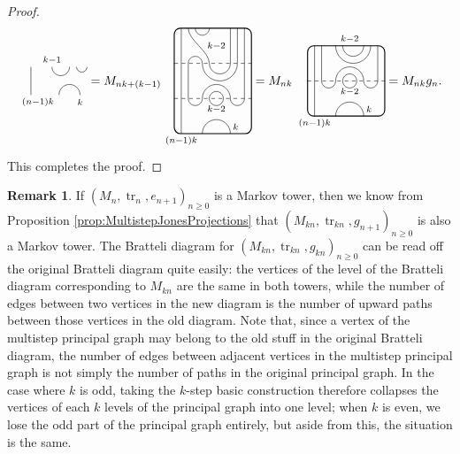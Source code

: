 \documentclass[11pt]{article}
\theoremstyle{plain}
\theoremstyle{definition}
\newtheorem{remark}[thm]{Remark}
\DeclareMathOperator{\tr}{tr}
\begin{document}
\begin{proof}
$$\begin{tikzpicture}[baseline = .3cm]
 \draw (.2,0) -- (.2,.8);
 \draw (.8,.8) arc (-180:0:.25cm);
 \draw (1.5,.8) arc (-180:0:.15cm);
 \draw (1,0) arc (180:0:.3cm);
 \node at (.8,1) {\scriptsize{$k{-}1$}};
 \node at (1.6,-.2) {\scriptsize{$k$}};
 \node at (.4,-.2) {\scriptsize{$(n{-}1)k$}};
\end{tikzpicture}
=
M_{nk+(k-1)}
\begin{tikzpicture}[baseline = 1.4cm]
 \draw[thick, rounded corners = 5pt] (0,0) rectangle (2.2,3);
 \draw (.2,0) -- (.2,3);
 \draw (.6,3) arc (-180:0:.2cm);
 \draw (.4,3) .. controls ++(270:.35cm) and ++(90:.35cm) .. (1,2) arc (-180:0:.3cm) -- (1.6,3);
 \draw (1.8,3) -- (1.8,2) arc (0:-180:.5cm) arc (0:180:.2cm) -- (.4,1) arc (-180:0:.2cm) arc (180:0:.4cm) arc (-180:0:.2cm) -- (2,3);
 \draw (1.2,1) circle (.2cm);
 \draw (.8,0) arc (180:0:.4cm);
 \draw[dashed] (0,1) -- (2.2,1);
 \draw[dashed] (0,2) -- (2.2,2);
 \node at (1.2,.7) {\scriptsize{$k{-}2$}};
 \node at (1.2,2.5) {\scriptsize{$k{-}2$}};
 \node at (1.75,.2) {\scriptsize{$k$}};
 \node at (.2,-.2) {\scriptsize{$(n{-}1)k$}};
\end{tikzpicture}
=
M_{nk}\,
\begin{tikzpicture}[baseline = .9cm]
 \draw[thick, rounded corners = 5pt] (0,0) rectangle (2.2,2);
 \draw (.2,0) -- (.2,2);
 \draw (1,2) arc (-180:0:.3cm);
 \draw (1.8,2) arc (0:-180:.5cm); 
 \draw (.4,2) -- (.4,1) arc (-180:0:.2cm) arc (180:0:.4cm) arc (-180:0:.2cm) -- (2,2);
 \draw (1.2,1) circle (.2cm);
 \draw (.8,0) arc (180:0:.4cm);
 \draw[dashed] (0,1) -- (2.2,1);
 \node at (1.2,.7) {\scriptsize{$k{-}2$}};
 \node at (1.2,2.2) {\scriptsize{$k{-}2$}};
 \node at (1.75,.2) {\scriptsize{$k$}};
 \node at (.2,-.2) {\scriptsize{$(n{-}1)k$}};
\end{tikzpicture}
=
M_{nk} g_n.
$$
This completes the proof.
\end{proof}



\begin{remark}
 \label{Rem:MultistepTowerEffects}
If $\left( M_n, \tr_n, e_{n+1} \right )_{n \geq 0}$ is a Markov tower, then we know from Proposition \ref{prop:MultistepJonesProjections} that 
$\left( M_{kn}, \tr_{kn}, g_{n+1} \right )_{n\geq 0}$ is also a Markov tower. 
The Bratteli diagram for $\left( M_{kn}, \tr_{kn}, g_{kn} \right )_{n\geq 0}$ can be read off the original Bratteli diagram quite easily: the vertices of the level of the Bratteli diagram corresponding to $M_{kn}$ are the same in both towers, while the number of edges between two vertices in the new diagram is the number of upward paths between those vertices in the old diagram.
Note that, since a vertex of the multistep principal graph may belong to the old stuff in the original Bratteli diagram, the number of edges between adjacent vertices in the multistep principal graph is not simply the number of paths in the original principal graph.
In the case where $k$ is odd, taking the $k$-step basic construction therefore collapses the vertices of each $k$ levels of the principal graph into one level; when $k$ is even, we lose the odd part of the principal graph entirely, but aside from this, the situation is the same.
\end{remark}
\end{document}
